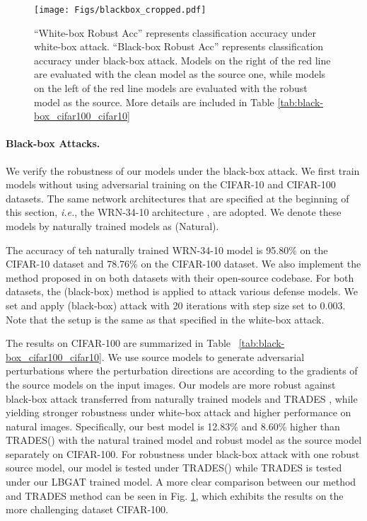 \documentclass[final]{cvpr}
\begin{document}
\begin{figure}[t]
	\begin{center}
		\texttt{[image: Figs/blackbox\_cropped.pdf]}
		\caption{``White-box Robust Acc'' represents classification accuracy under white-box attack. ``Black-box Robust Acc'' represents classification accuracy under black-box attack. Models on the right of the red line are evaluated with the clean model as the source one, while models on the left of the red line models are evaluated with the robust model as the source. More details are included in Table \ref{tab:black-box_cifar100_cifar10}}
		\label{fig:blackbox}
	\end{center}
\end{figure}

\paragraph{Black-box Attacks.}
We verify the robustness of our models under the black-box attack. We first train models without using adversarial training on the CIFAR-10 and CIFAR-100 datasets. The same network architectures that are specified at the beginning of this section, {\it i.e.}, the WRN-34-10 architecture \cite{DBLP:conf/bmvc/ZagoruykoK16}, are adopted. We denote these models by naturally trained models as (Natural). 

The accuracy of teh naturally trained WRN-34-10 model is 95.80\% on the CIFAR-10 dataset and 78.76\% on the CIFAR-100 dataset. We also implement the method proposed in \cite{zhang2019theoretically} on both datasets with their open-source codebase. For both datasets, the  (black-box) method is applied to attack various defense models. We set  and apply  (black-box) attack with 20 iterations with step size set to 0.003. Note that the setup is the same as that specified in the white-box attack.

The results on CIFAR-100 are summarized in Table ~\ref{tab:black-box_cifar100_cifar10}. We use source models to generate adversarial perturbations where the perturbation directions are according to the gradients of the source models on the input images. Our models are more robust against black-box attack transferred from naturally trained models and TRADES \cite{zhang2019theoretically}, while yielding stronger robustness under white-box attack and higher performance on natural images. Specifically, our best model is 12.83\% and 8.60\% higher than TRADES() with the natural trained model and robust model as the source model separately on CIFAR-100. For robustness under black-box attack with one robust source model, our model is tested under TRADES() while TRADES is tested under our LBGAT trained model. A more clear comparison between our method and TRADES method can be seen in Fig. \ref{fig:blackbox}, which exhibits the results on the more challenging dataset CIFAR-100.
\end{document}
